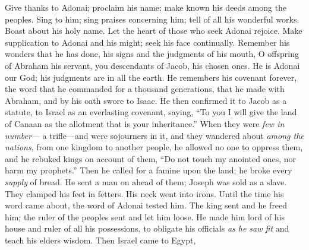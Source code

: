 \begin{biblechapter} %
 Give thanks to Adonai; proclaim his name; 
make known his deeds among the peoples.
\verse Sing to him; sing praises concerning him; 
tell of all his wonderful works.
\verse Boast about his holy name. 
Let the heart of those who seek Adonai rejoice.
\verse Make supplication to Adonai and his might; 
seek his face continually.
\verse Remember his wonders that he has done, 
his signs and the judgments of his mouth,
\verse O offspring of Abraham his servant, 
you descendants of Jacob, his chosen ones.
\verse He is Adonai our God; 
his judgments are in all the earth.
\verse He remembers his covenant forever, 
the word that he commanded 
for a thousand generations,
\verse that he made with Abraham, 
and by his oath swore to Isaac.
\verse He then confirmed it to Jacob as a statute, 
to Israel as an everlasting covenant,
\verse saying, “To you I will give the land of Canaan 
as the allotment that is your inheritance.”
\verse When they were \textit{few in number}— 
a trifle—and were sojourners in it,
\verse and they wandered about \textit{among the nations}, 
from one kingdom to another people,
\verse he allowed no one to oppress them, 
and he rebuked kings on account of them,
\verse “Do not touch my anointed ones, 
nor harm my prophets.”
\verse Then he called for a famine upon the land; 
he broke every \textit{supply} of bread.
\verse He sent a man on ahead of them; 
Joseph was sold as a slave.
\verse They clamped his feet in fetters. 
His neck went into irons.
\verse Until the time his word came about, 
the word of Adonai tested him.
\verse The king sent and he freed him; 
the ruler of the peoples sent and let him loose.
\verse He made him lord of his house 
and ruler of all his possessions,
\verse to obligate his officials \textit{as he saw fit} 
and teach his elders wisdom.
\verse Then Israel came to Egypt, 

\end{biblechapter}
